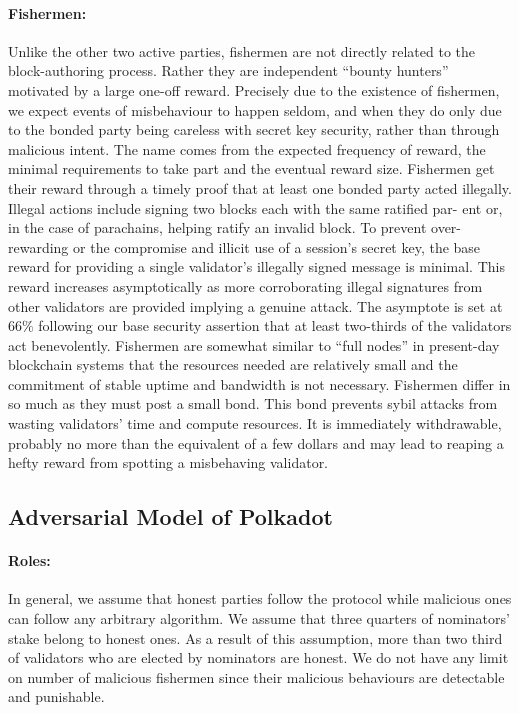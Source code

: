 \paragraph{Fishermen:} Unlike the other two active parties, fishermen are not directly related to the block-authoring process. Rather they are independent “bounty hunters” motivated by a large one-off reward. Precisely due to
the existence of fishermen, we expect events of misbehaviour to happen seldom, and when they do only due to the bonded party being careless with secret key security, rather than through malicious intent. The name comes from the expected frequency of reward, the minimal requirements to take part and the eventual reward size.
Fishermen get their reward through a timely proof that at least one bonded party acted illegally. Illegal actions include signing two blocks each with the same ratified par- ent or, in the case of parachains, helping ratify an invalid block. To prevent over-rewarding or the compromise and illicit use of a session’s secret key, the base reward for providing a single validator’s illegally signed message is minimal. This reward increases asymptotically as more corroborating illegal signatures from other validators are provided implying a genuine attack. The asymptote is set at 66$\%$ following our base security assertion that at least two-thirds of the validators act benevolently.
Fishermen are somewhat similar to “full nodes” in present-day blockchain systems that the resources needed are relatively small and the commitment of stable uptime and bandwidth is not necessary. Fishermen differ in so much as they must post a small bond. This bond prevents sybil attacks from wasting validators’ time and compute resources. It is immediately withdrawable, probably no more than the equivalent of a few dollars and may lead to reaping a hefty reward from spotting a misbehaving validator.

\subsection{Adversarial Model of Polkadot}

\paragraph{Roles:} In general, we assume that honest parties follow the protocol while malicious ones can follow any arbitrary algorithm. We assume that three quarters of nominators' stake belong to honest ones. As a result of this assumption, more than two third of validators who are elected by nominators are honest. We do not have any limit on number of malicious fishermen since their malicious behaviours are detectable and punishable.  

